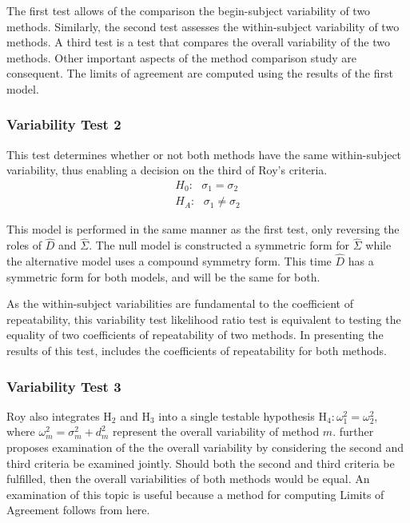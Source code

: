 \documentclass[12pt, a4paper]{report}
\theoremstyle{plain}
\theoremstyle{definition}
\theoremstyle{remark}
\begin{document}
The first test allows of the comparison the begin-subject variability of two methods. Similarly, the second test assesses the within-subject variability of two methods. A third test is a test that compares the overall variability of the two methods. Other important aspects of the method comparison study are consequent. The limits of agreement are computed using the results of the first model.


\subsubsection{Variability Test 2}

This test determines whether or not both methods have the same within-subject variability, thus enabling a decision on the third of Roy's criteria.
\begin{eqnarray*}
H_{0}: \mbox{ }\sigma_{1}  = \sigma_{2} \\
H_{A}: \mbox{ }\sigma_{1}  \neq \sigma_{2}
\end{eqnarray*}

This model is performed in the same manner as the first test, only reversing the roles of ${\hat{D}}$ and ${\hat{\Sigma}}$. The null model is constructed a symmetric form for ${\hat{\Sigma}}$ while the alternative model uses a compound symmetry form. This time ${\hat{D}}$ has a symmetric form for both models, and will be the same for both.

As the within-subject variabilities are fundamental to the coefficient of repeatability, this variability test likelihood ratio test is equivalent to testing the equality of two coefficients of repeatability of two methods. In presenting the results of this test, \citet{ARoy2009} includes the coefficients of repeatability for both methods.


\subsubsection{Variability Test 3}
Roy also integrates $\mathrm{H}_2$ and $\mathrm{H}_3$ into a single testable hypothesis $\mathrm{H}_4\colon \omega^2_1=\omega^2_2,$ where $\omega^2_m = \sigma^2_m + d^2_m$ represent the overall variability of method $m.$ \citet{ARoy2009} further proposes examination of the the overall variability by considering the second and third criteria be examined jointly. Should both the second and third criteria be fulfilled, then the overall variabilities of both methods would be equal. An examination of this topic is useful because a method for computing Limits of Agreement follows from here.
\end{document}

